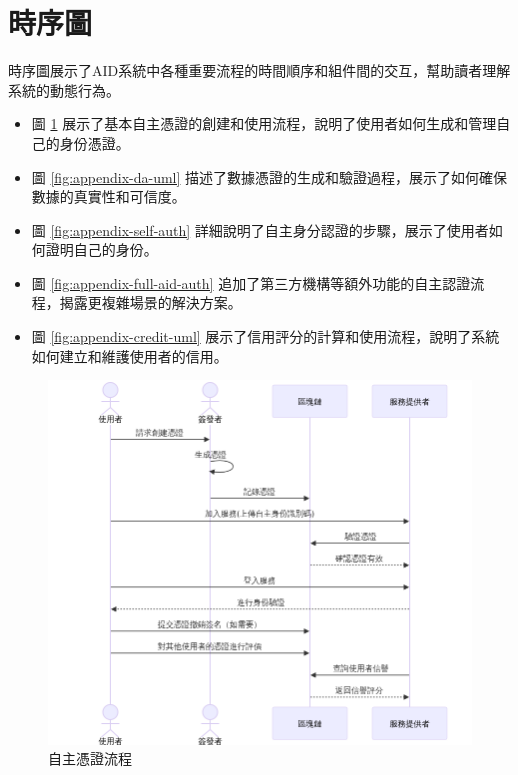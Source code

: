 \section{時序圖}
時序圖展示了AID系統中各種重要流程的時間順序和組件間的交互，幫助讀者理解系統的動態行為。
\begin{itemize}
  \item 圖 \ref{fig:appendix-ca-uml} 展示了基本自主憑證的創建和使用流程，說明了使用者如何生成和管理自己的身份憑證。
  \item 圖 \ref{fig:appendix-da-uml} 描述了數據憑證的生成和驗證過程，展示了如何確保數據的真實性和可信度。
  \item 圖 \ref{fig:appendix-self-auth} 詳細說明了自主身分認證的步驟，展示了使用者如何證明自己的身份。
  \item 圖 \ref{fig:appendix-full-aid-auth} 追加了第三方機構等額外功能的自主認證流程，揭露更複雜場景的解決方案。
  \item 圖 \ref{fig:appendix-credit-uml} 展示了信用評分的計算和使用流程，說明了系統如何建立和維護使用者的信用。
\end{itemize}
\begin{figure}[p]
  \centering
  \includegraphics[width=\linewidth]{figures/CA-UML.png}
  \caption{自主憑證流程}
  \label{fig:appendix-ca-uml}
\end{figure}
\clearpage
